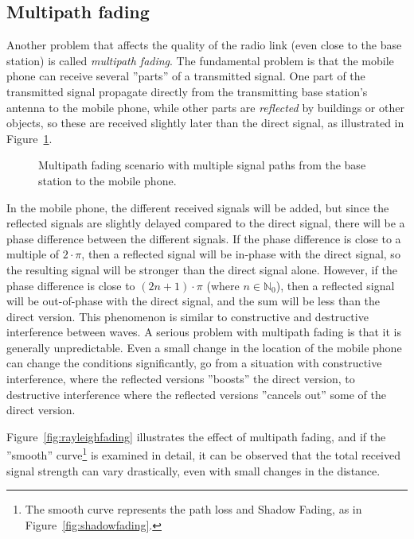 \subsection{Multipath fading}
Another problem that affects the quality of the radio link (even close to the base station) is called \emph{multipath fading}. The fundamental problem is that the mobile phone can receive several ''parts'' of a transmitted signal. One part of the transmitted signal propagate directly from the transmitting base station's antenna to the mobile phone, while other parts are \emph{reflected} by buildings or other objects, so these are received  slightly later than the direct signal, as illustrated in Figure~\ref{fig:rayleigh_scenario}.

\begin{figure}[htbp]
\centering
{}
\captionsetup{format=hang,margin=2cm}
\caption[Multipath fading scenario with multiple signal paths from the base station \ldots]{\label{fig:rayleigh_scenario}Multipath fading scenario with multiple signal paths from the base station to the mobile phone.}
\end{figure}

In the mobile phone, the different received signals will be added, but since the reflected signals are slightly delayed compared to the direct signal, there will be a phase difference between the different signals. If the phase difference is close to a multiple of $2\cdot{}\pi$, then a reflected signal will be in-phase with the direct signal, so the resulting signal will be stronger than the direct signal alone. However, if the phase difference is close to $(2n+1)\cdot{}\pi$ (where $n\in\mathbb{N}_0$), then a reflected signal will be out-of-phase with the direct signal, and the sum will be less than the direct version. This phenomenon is similar to constructive and destructive interference between waves. A serious problem with multipath fading is that it is generally unpredictable. Even a small change in the location of the mobile phone can change the conditions significantly, \ie go from a situation with constructive interference, where the reflected versions ''boosts'' the direct version, to destructive interference where the reflected versions ''cancels out'' some of the direct version.

Figure~\ref{fig:rayleighfading} illustrates the effect of multipath fading, and if the ''smooth'' curve\footnote{The smooth curve represents the path loss and Shadow Fading, as in Figure~\ref{fig:shadowfading}.} is examined in detail, it can be observed that the total received signal strength can vary drastically, even with small changes in the distance.

